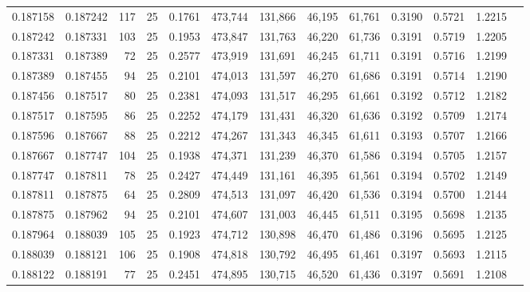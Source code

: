 \begin{tabular}{rrrrrrrrrrrrr}
0.187158 & 0.187242 &   117 &  25 &                                     0.1761 & 473,744 & 131,866 &  46,195 &  61,761 & 0.3190 & 0.5721 & 1.2215 \\
0.187242 & 0.187331 &   103 &  25 &                                     0.1953 & 473,847 & 131,763 &  46,220 &  61,736 & 0.3191 & 0.5719 & 1.2205 \\
0.187331 & 0.187389 &    72 &  25 &                                     0.2577 & 473,919 & 131,691 &  46,245 &  61,711 & 0.3191 & 0.5716 & 1.2199 \\
0.187389 & 0.187455 &    94 &  25 &                                     0.2101 & 474,013 & 131,597 &  46,270 &  61,686 & 0.3191 & 0.5714 & 1.2190 \\
0.187456 & 0.187517 &    80 &  25 &                                     0.2381 & 474,093 & 131,517 &  46,295 &  61,661 & 0.3192 & 0.5712 & 1.2182 \\
0.187517 & 0.187595 &    86 &  25 &                                     0.2252 & 474,179 & 131,431 &  46,320 &  61,636 & 0.3192 & 0.5709 & 1.2174 \\
0.187596 & 0.187667 &    88 &  25 &                                     0.2212 & 474,267 & 131,343 &  46,345 &  61,611 & 0.3193 & 0.5707 & 1.2166 \\
0.187667 & 0.187747 &   104 &  25 &                                     0.1938 & 474,371 & 131,239 &  46,370 &  61,586 & 0.3194 & 0.5705 & 1.2157 \\
0.187747 & 0.187811 &    78 &  25 &                                     0.2427 & 474,449 & 131,161 &  46,395 &  61,561 & 0.3194 & 0.5702 & 1.2149 \\
0.187811 & 0.187875 &    64 &  25 &                                     0.2809 & 474,513 & 131,097 &  46,420 &  61,536 & 0.3194 & 0.5700 & 1.2144 \\
0.187875 & 0.187962 &    94 &  25 &                                     0.2101 & 474,607 & 131,003 &  46,445 &  61,511 & 0.3195 & 0.5698 & 1.2135 \\
0.187964 & 0.188039 &   105 &  25 &                                     0.1923 & 474,712 & 130,898 &  46,470 &  61,486 & 0.3196 & 0.5695 & 1.2125 \\
0.188039 & 0.188121 &   106 &  25 &                                     0.1908 & 474,818 & 130,792 &  46,495 &  61,461 & 0.3197 & 0.5693 & 1.2115 \\
0.188122 & 0.188191 &    77 &  25 &                                     0.2451 & 474,895 & 130,715 &  46,520 &  61,436 & 0.3197 & 0.5691 & 1.2108 \\

\end{tabular}

